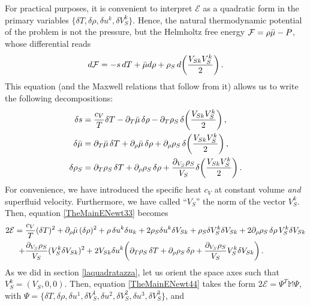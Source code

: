 \documentclass[a4paper, amsfonts, amssymb, amsmath, reprint, showkeys, nofootinbib, twoside,notitlepage,onecolumn]{revtex4-2}
\theoremstyle{definition}
\theoremstyle{theorem}
\theoremstyle{corollary}
\begin{document}
For practical purposes, it is convenient to interpret $\mathcal{E}$ as a quadratic form in the primary variables $\{\delta T,\delta \rho, \delta u^k,\delta V_S^k \}$. Hence, the natural thermodynamic potential of the problem is not the pressure, but the Helmholtz free energy $\mathcal{F}=\rho \Bar{\mu}-P$, whose differential reads
\begin{equation}\label{dPippoNewt}
d\mathcal{F}= -s\, dT + \Bar{\mu} d\rho  + \rho_S \,  d\bigg(\dfrac{V_{Sk} V_S^{k}}{2} \bigg) \, .
\end{equation}
This equation (and the Maxwell relations that follow from it) allows us to write the following decompositions:
\begin{equation}
\begin{split}
\delta s ={}& \dfrac{c_V}{T} \delta T -\partial_T \Bar{\mu}\,  \delta \rho -\partial_T \rho_S \, \delta \bigg(\dfrac{V_{Sk} V_S^{k}}{2} \bigg)  \, , \\
\delta \Bar{\mu} ={}& \partial_T \Bar{\mu} \,\delta T +\partial_\rho \Bar{\mu} \, \delta \rho +\partial_\rho \rho_S \, \delta \bigg(\dfrac{V_{Sk} V_S^{k}}{2} \bigg)  \, , \\
\delta \rho_S ={}& \partial_T \rho_S \, \delta T +\partial_\rho \rho_S \, \delta \rho +\dfrac{\partial_{V_S}\rho_S}{V_S} \delta \bigg(\dfrac{V_{Sk} V_S^{k}}{2} \bigg) \, . \\
\end{split}
\end{equation}
For convenience, we have introduced the specific heat $c_V$ at constant volume \textit{and} superfluid velocity. Furthermore, we have called ``$V_S$'' the norm of the vector $V_S^k$. Then, equation \eqref{TheMainENewt33} becomes
\begin{equation}\label{TheMainENewt44}
\begin{split}
2\mathcal{E}={}& \dfrac{c_V}{T} (\delta T)^2+ \partial_\rho \Bar{\mu} \, (\delta \rho)^2 +\rho\,\delta u^k \delta u_k+2  \rho_S \delta u^k   \delta  V_{Sk} +\rho_S \delta V^{k}_S\delta V_{Sk}   +2\partial_\rho \rho_S \, \delta \rho \, V_S^k \delta V_{Sk} \\
+{}& \dfrac{\partial_{V_S}\rho_S}{V_S}  (V^{k}_S\delta V_{Sk})^2 +2 V_{Sk} \delta u^k   \bigg( \partial_T \rho_S \, \delta T +\partial_\rho \rho_S \, \delta \rho +\dfrac{\partial_{V_S}\rho_S}{V_S} V_S^k \delta V_{Sk} \bigg)  \, .\\
\end{split}
\end{equation}
As we did in section \ref{laquadratazza}, let us orient the space axes such that $V_S^k=(V_S,0,0)$. Then, equation \eqref{TheMainENewt44} takes the form $2\mathcal{E}=\Psi^T \mathbb{M}\Psi$, with $\Psi=\{\delta T, \delta\rho, \delta u^1, \delta V_S^1, \delta u^2, \delta V_S^2,\delta u^3, \delta V_S^3\}$, and
\end{document}
